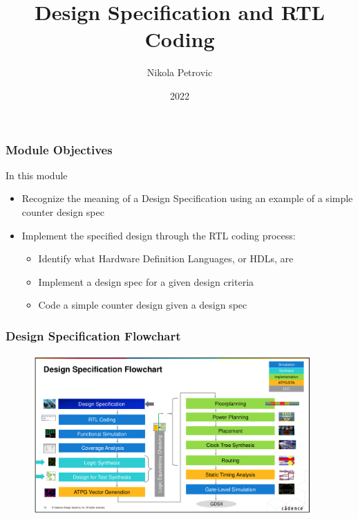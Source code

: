 \documentclass{beamer}
\title{Design Specification and RTL Coding}
\author{Nikola Petrovic}
\institute{University of Belgrade, School of Electrical Engineering}
\date{2022}
\begin{document}
\frame{\titlepage}

\begin{frame}
\frametitle{Module Objectives}

In this module
\begin{itemize}
\item Recognize the meaning of a Design Specification using an example of a simple counter design spec
\item Implement the specified design through the RTL coding process:
\begin{itemize}
	\item Identify what Hardware Definition Languages, or HDLs, are
	\item Implement a design spec for a given design criteria
	\item Code a simple counter design given a design spec
\end{itemize}
\end{itemize}
\end{frame}

\begin{frame}
\frametitle{Design Specification Flowchart}

\begin{figure}
\centering
    \includegraphics[width=0.95\textwidth]{map.png}
    \label{fig:map}
\end{figure}
\end{frame}
\end{document}
